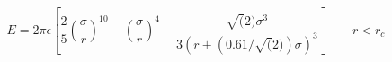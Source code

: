 


$$
 E = 2 \pi \epsilon \left[ \frac{2}{5} \left(\frac{\sigma}{r}\right)^{10} - 
                       \left(\frac{\sigma}{r}\right)^4 -
                       \frac{\sqrt(2)\sigma^3}{3\left(r+\left(0.61/\sqrt(2)\right)\sigma\right)^3}\right]
                       \qquad r < r_c
$$

